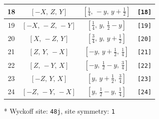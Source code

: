 \documentclass[fleqn,8pt]{jsarticle}
\begin{document}
\begin{longtable}{cccc}
18 & $\left[ - X,\, Z,\, Y \right]$ & $\left[ \frac{1}{4},\, - y,\, y + \frac{1}{2} \right]$ & {\tt [18]} \\ \hline
19 & $\left[ - X,\, - Z,\, - Y \right]$ & $\left[ \frac{1}{4},\, y,\, \frac{1}{2} - y \right]$ & {\tt [19]} \\ \hline
20 & $\left[ X,\, - Z,\, Y \right]$ & $\left[ \frac{3}{4},\, y,\, y + \frac{1}{2} \right]$ & {\tt [20]} \\ \hline
21 & $\left[ Z,\, Y,\, - X \right]$ & $\left[ - y,\, y + \frac{1}{2},\, \frac{1}{4} \right]$ & {\tt [21]} \\ \hline
22 & $\left[ Z,\, - Y,\, X \right]$ & $\left[ - y,\, \frac{1}{2} - y,\, \frac{3}{4} \right]$ & {\tt [22]} \\ \hline
23 & $\left[ - Z,\, Y,\, X \right]$ & $\left[ y,\, y + \frac{1}{2},\, \frac{3}{4} \right]$ & {\tt [23]} \\ \hline
24 & $\left[ - Z,\, - Y,\, - X \right]$ & $\left[ y,\, \frac{1}{2} - y,\, \frac{1}{4} \right]$ & {\tt [24]} \\
\end{longtable}
* Wyckoff site: {\tt 48j}, site symmetry: {\tt 1}
\renewcommand{\arraystretch}{1.2}
\end{document}

